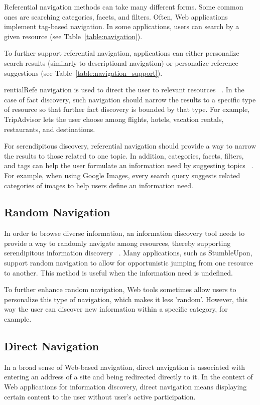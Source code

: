 {{Referential navigation methods can take many different forms. Some common ones are searching categories, facets, and filters. Often, Web applications implement tag-based navigation. In some applications, users can search by a given resource (see Table~\ref{table:navigation}).

To further support referential navigation, applications can either personalize search results (similarly to descriptional navigation) or personalize reference suggestions (see Table~\ref{table:navigation_support}). 

rentialRefe navigation is used to direct the user to relevant resources ~\cite{levene}. In the case of fact discovery, such navigation should narrow the results to a specific type of resource so that further fact discovery is bounded by that type. For example, TripAdvisor lets the user choose among flights, hotels, vacation rentals, restaurants, and destinations.

For serendipitous discovery, referential navigation should provide a way to narrow the results to those related to one topic. In addition, categories, facets, filters, and tags can help the user formulate an information need by suggesting topics ~\cite{levene}. For example, when using Google Images, every search query suggests related categories of images to help users define an information need.

} %

{\subsection{Random Navigation}
In order to browse diverse information, an information discovery tool needs to provide a way to randomly navigate among resources, thereby supporting serendipitous information discovery ~\cite{foster}. Many applications, such as StumbleUpon, support random navigation to allow for opportunistic jumping from one resource to another. This method is useful when the information need is undefined.

To further enhance random navigation, Web tools sometimes allow users to personalize this type of navigation, which makes it less 'random'. However, this way the user can discover new information within a specific category, for example.
} %

{\subsection{Direct Navigation}
In a broad sense of Web-based navigation, direct navigation is associated with entering an address of a site and being redirected directly to it. In the context of Web applications for information discovery, direct navigation means displaying certain content to the user without user's active participation.  

}}
